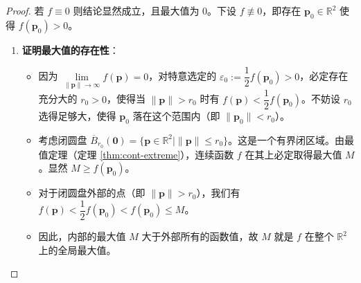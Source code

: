 \documentclass[lang=cn,11pt]{elegantbook}
\begin{document}
\begin{proof}
若 $f\equiv 0$ 则结论显然成立，且最大值为 0。下设 $f \not\equiv 0$，即存在 $\boldsymbol{p}_0 \in \mathbb{R}^2$ 使得 $f(\boldsymbol{p}_0) > 0$。

\begin{enumerate}
  \item \textbf{证明最大值的存在性}：
  \begin{itemize}
    \item 因为 $\lim\limits_{\|\boldsymbol{p}\|\to\infty}f(\boldsymbol{p})=0$，对特意选定的 $\varepsilon_0:=\dfrac12f(\boldsymbol{p}_0)>0$，必定存在充分大的 $r_0>0$，使得当 $\|\boldsymbol{p}\|>r_0$ 时有 $f(\boldsymbol{p})<\dfrac12f(\boldsymbol{p}_0)$。不妨设 $r_0$ 选得足够大，使得 $\boldsymbol{p}_0$ 落在这个范围内（即 $\|\boldsymbol{p}_0\|<r_0$）。
    \item 考虑闭圆盘 $\overline{B}_{r_0}(\boldsymbol{0}) = \{\boldsymbol{p}\in\mathbb{R}^2 \mid \|\boldsymbol{p}\| \leqslant  r_0\}$。这是一个有界闭区域。由最值定理（定理 \ref{thm:cont-extreme}），连续函数 $f$ 在其上必定取得最大值 $M$。显然 $M \geq f(\boldsymbol{p}_0)$。
    \item 对于闭圆盘外部的点（即 $\|\boldsymbol{p}\|>r_0$），我们有 $f(\boldsymbol{p})<\dfrac12f(\boldsymbol{p}_0) < f(\boldsymbol{p}_0) \leqslant  M$。
    \item 因此，内部的最大值 $M$ 大于外部所有的函数值，故 $M$ 就是 $f$ 在整个 $\mathbb{R}^2$ 上的全局最大值。
  \end{itemize}


\end{enumerate}
\end{proof}
\end{document}
